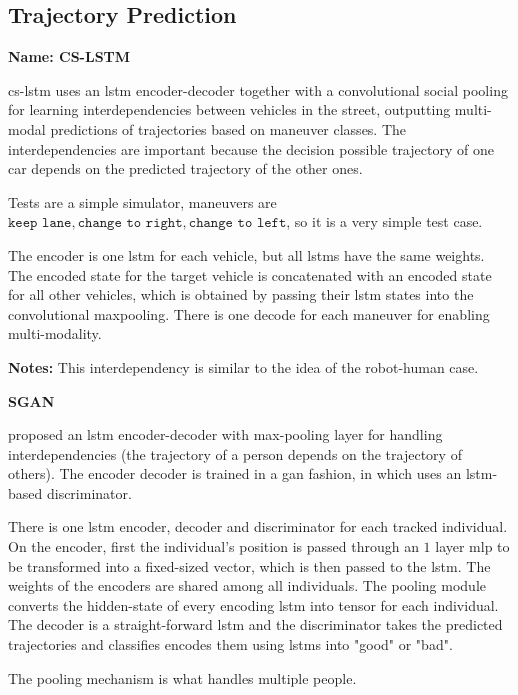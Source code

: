 \subsection{Trajectory Prediction}\label{sec: traj prediction}


\textbf{Name: CS-LSTM}

\cite{deo2018convolutional} \gls{cs-lstm} uses an \gls{lstm} encoder-decoder together with a convolutional social pooling for learning interdependencies between vehicles in the street, outputting multi-modal predictions of trajectories based on maneuver classes.
%
The interdependencies are important because the decision possible trajectory of one car depends on the predicted trajectory of the other ones.

Tests are a simple simulator, maneuvers are ${\texttt{keep lane}, \texttt{change to right}, \texttt{change to left}}$, so it is a very simple test case.

The encoder is one \gls{lstm} for each vehicle, but all \glspl{lstm} have the same weights.
%
The encoded state for the target vehicle is concatenated with an encoded state for all other vehicles, which is obtained by passing their \gls{lstm} states into the convolutional maxpooling.
%
There is one decode for each maneuver for enabling multi-modality.

\textbf{Notes:} This interdependency is similar to the idea of the robot-human case.


\textbf{SGAN}

\cite{gupta2018social} proposed an \gls{lstm} encoder-decoder with max-pooling layer for handling interdependencies (the trajectory of a person depends on the trajectory of others).
%
The encoder decoder is trained in a \gls{gan} fashion, in which uses an \gls{lstm}-based discriminator.

There is one \gls{lstm} encoder, decoder and discriminator for each tracked individual.
%
On the encoder, first the individual's position is passed through an $1$ layer \gls{mlp} to be transformed into a fixed-sized vector, which is then passed to the \gls{lstm}. The weights of the encoders are shared among all individuals.
%
The pooling module converts the hidden-state of every encoding \gls{lstm} into tensor for each individual.
%
The decoder is a straight-forward \gls{lstm} and the discriminator takes the predicted trajectories and classifies encodes them using \glspl{lstm} into "good" or "bad".

The pooling mechanism is what handles multiple people.


\cite{sun20183dof}


\cite{syed2020cnn}